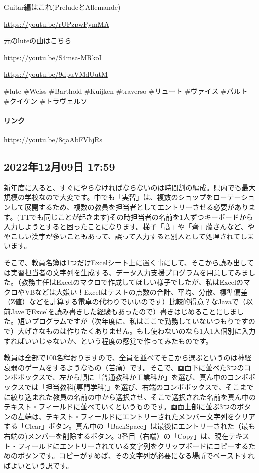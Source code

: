 Guitar編はこれ(PreludeとAllemande)

\url{https://youtu.be/rUPzpwPymMA}

元のluteの曲はこちら

\url{https://youtu.be/S4msa-MRkoI}

\url{https://youtu.be/9dpuVMdUutM}

\#lute \#Weiss \#Barthold \#Kuĳken \#traverso \#リュート \#ヴァイス \#バルト \#クイケン \#トラヴェルソ

\paragraph{リンク}
\url{https://youtu.be/8qaAbFVhjRs}

\subsection*{2022年12月09日 17:59}

新年度に入ると、すぐにやらなければならないのは時間割の編成。県内でも最大規模の学校なので大変です。中でも「実習」は、複数のショップをローテーションして展開するため、複数の教員を担当者としてエントリーさせる必要があります。(TTでも同じことが起きます)その時担当者の名前を1人ずつキーボードから入力しようとすると困ったことになります。梯子「髙」や「齊」藤さんなど、ややこしい漢字が多いこともあって、誤って入力すると別人として処理されてしまいます。

そこで、教員名簿は1つだけExcelシート上に置く事にして、そこから読み出しては実習担当者の文字列を生成する、データ入力支援プログラムを用意してみました。（教務主任はExcelのマクロで作成してほしい様子でしたが、私はExcelのマクロやVBなどは大嫌い！Excelはテストの点数の合計、平均、分散、標準偏差（Z値）などを計算する電卓の代わりでいいのです）比較的得意？なJavaで（以前JaveでExcelを読み書きした経験もあったので）書きはじめることにしました。短いプログラムですが（次年度に、私はここで勤務していないつもりですので）大げさなものは作りたくありません。もし使わないのなら1人1人個別に入力すればいいじゃないか、という程度の感覚で作ってみたものです。

教員は全部で100名程おりますので、全員を並べてそこから選ぶというのは神経衰弱のゲームをするようなもの（苦痛）です。そこで、画面下に並べた3つのコンボボックスで、左から順に「普通教科か工業科か」を選び、真ん中のコンボボックスでは「担当教科(専門学科)」を選び、右端のコンボボックスで、そこまでに絞り込まれた教員の名前の中から選択させ、そこで選択された名前を真ん中のテキスト・フィールドに並べていくというものです。画面上部に並ぶ3つのボタンの左端は、テキスト・フィールドにエントリーされたメンバー文字列をクリアする「Clear」ボタン。真ん中の「BackSpace」は最後にエントリーされた（最も右端の)メンバーを削除するボタン。3番目（右端）の「Copy」は、現在テキスト・フィールドにエントリーされている文字列をクリップボードにコピーするためのボタンです。コピーがすめば、その文字列が必要になる場所でペーストすればよいという訳です。

